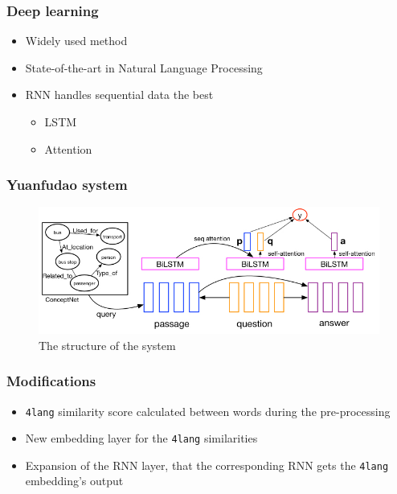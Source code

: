 \documentclass[bigger]{beamer}
\newcommand{\fl}{\texttt{4lang}\xspace}
\begin{document}

\begin{frame}
	\frametitle{Deep learning}
	\begin{itemize}
		\pause \item Widely used method
		\pause \item State-of-the-art in Natural Language Processing
		\pause \item RNN handles sequential data the best
		\begin{itemize}
			\pause \item LSTM
			\pause \item Attention
		\end{itemize}
	\end{itemize}
\end{frame}


\begin{frame}
	\frametitle{Yuanfudao system}
	\begin{figure}[h!]
		\centering
		\includegraphics[scale=0.4]{pics/TriAN.jpg}
		\caption{The structure of the system}
		\label{fig:dnn}
	\end{figure}
\end{frame}
\begin{frame}
	\frametitle{Modifications}
	\begin{itemize}
		\pause \item \fl similarity score calculated between words during the pre-processing
		\pause \item New embedding layer for the \fl similarities
		\pause \item Expansion of the RNN layer, that the corresponding RNN gets the \fl embedding's output
	\end{itemize}
\end{frame}


\end{document}
